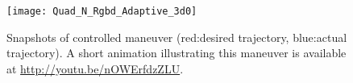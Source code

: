 \documentclass[letterpaper, 10pt, conference]{ieeeconf}
\begin{document}
\begin{figure}
\centerline{
		\texttt{[image: Quad\_N\_Rgbd\_Adaptive\_3d0]}
}
\caption{Snapshots of controlled maneuver (red:desired trajectory, blue:actual trajectory). A short animation illustrating this maneuver is available at {\href{http://youtu.be/nOWErfdzZLU}{http://youtu.be/nOWErfdzZLU}}.}\label{fig:SS}
\end{figure}


\vfill


\end{document}
